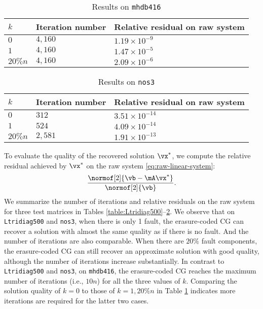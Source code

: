 \documentclass[11pt]{article}
\begin{document}
\begin{table}[t]
\caption{{Results on {\tt mhdb416}}}
\begin{center}
\begin{tabular}{lll}
  \toprule
  $k$ & Iteration number & Relative residual on raw system\\
  \midrule
  $0$ & $4,160$ & $1.19\times 10^{-9}$ \\
  $1$ & $4,160$ & $1.47\times 10^{-5}$ \\
  $20\%n$ & $4,160$ & $2.09\times 10^{-6}$\\
  \bottomrule
 \end{tabular}
\end{center}
\label{table:mhdb416}
\end{table}

\begin{table}[t]
\caption{{Results on {\tt nos3}}}
\begin{center}
\begin{tabular}{lll}
  \toprule
  $k$ & Iteration number & Relative residual on raw system \\
  \midrule
  $0$ & $312$ & $3.51\times 10^{-14}$ \\
  $1$ & $524$ & $4.09\times 10^{-14}$ \\
  $20\%n$ & $2,581$ & $1.91\times 10^{-13}$\\
  \bottomrule
 \end{tabular}
\end{center}
\label{table:nos3}
\end{table}

To evaluate the quality of the recovered solution $\vx^{\ast}$, we compute the relative residual achieved by $\vx^{\ast}$ on the raw system \eqref{eq:raw-linear-system}: 
\[ \frac{\normof[2]{\vb- \mA \vx^{\ast}}}{\normof[2]{\vb}}.\] 
We summarize the number of iterations and relative residuals on the raw system for three test matrices in Tables \ref{table:Ltridiag500}--\ref{table:nos3}. We observe that on {\tt Ltridiag500} and {\tt nos3}, when there is only 1 fault, the erasure-coded CG can recover a solution with almost the same quality as if there is no fault. And the number of iterations are also comparable. When there are $20\%$ fault components, the erasure-coded CG can still recover an approximate solution with good quality, although the number of iterations increase substantially. In contrast to {\tt Ltridiag500} and {\tt nos3}, on {\tt mhdb416}, the erasure-coded CG reaches the maximum number of iterations (i.e., $10n$) for all the three values of $k$. Comparing the solution quality of $k=0$ to those of $k=1,20\%n$ in Table \ref{table:mhdb416} indicates more iterations are required for the latter two cases.
\end{document}
